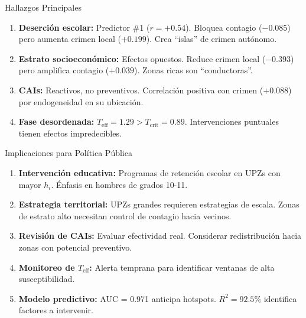 \documentclass[11pt]{beamer}
\begin{document}
\begin{frame}{Hallazgos Principales}

\begin{enumerate}
    \item \textbf{Deserción escolar:} Predictor \#1 ($r=+0.54$). Bloquea contagio ($-0.085$) pero aumenta crimen local ($+0.199$). Crea ``islas'' de crimen autónomo.
    
    \item \textbf{Estrato socioeconómico:} Efectos opuestos. Reduce crimen local ($-0.393$) pero amplifica contagio ($+0.039$). Zonas ricas son ``conductoras''.
    
    \item \textbf{CAIs:} Reactivos, no preventivos. Correlación positiva con crimen ($+0.088$) por endogeneidad en su ubicación.
    
    \item \textbf{Fase desordenada:} $T_{\text{eff}} = 1.29 > T_{\text{crit}} = 0.89$. Intervenciones puntuales tienen efectos impredecibles.
\end{enumerate}
\end{frame}

\begin{frame}{Implicaciones para Política Pública}

\begin{enumerate}
    \item \textbf{Intervención educativa:} Programas de retención escolar en UPZs con mayor $h_i$. Énfasis en hombres de grados 10-11.
    
    \item \textbf{Estrategia territorial:} UPZs grandes requieren estrategias de escala. Zonas de estrato alto necesitan control de contagio hacia vecinos.
    
    \item \textbf{Revisión de CAIs:} Evaluar efectividad real. Considerar redistribución hacia zonas con potencial preventivo.
    
    \item \textbf{Monitoreo de $T_{\text{eff}}$:} Alerta temprana para identificar ventanas de alta susceptibilidad.
    
    \item \textbf{Modelo predictivo:} AUC = 0.971 anticipa hotspots. $R^2 = 92.5\%$ identifica factores a intervenir.
\end{enumerate}
\end{frame}
\end{document}

